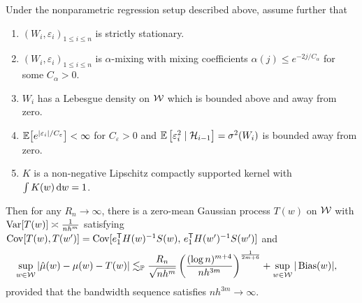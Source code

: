 \begin{proposition}%
  \label{pro:local_poly}

  Under the nonparametric regression setup described above,
  assume further that
  \begin{enumerate}[label=(\roman*)]

    \item
      $(W_i, \varepsilon_i)_{1 \leq i \leq n}$
      is strictly stationary.

    \item
      $(W_i, \varepsilon_i)_{1 \leq i \leq n}$
      is $\alpha$-mixing with mixing coefficients
      $\alpha(j) \leq e^{-2 j / C_\alpha}$
      for some $C_\alpha > 0$.

    \item
      $W_i$ has a Lebesgue density on $\mathcal{W}$
      which is bounded above and away from zero.

    \item
      $\mathbb{E}\big[e^{|\varepsilon_i|/C_\varepsilon}\big] < \infty$
      for $C_\varepsilon > 0$ and
      $\mathbb{E}\left[\varepsilon^2_i \mid \mathcal{H}_{i-1}\right]=\sigma^2(W_i)$
      is bounded away from zero.

    \item
      $K$ is a non-negative Lipschitz
      compactly supported kernel with
      $\int K(w) \,\mathrm{d}w = 1$.

  \end{enumerate}
  Then for any $R_n \to \infty$,
  there is a zero-mean Gaussian process
  $T(w)$ on $\mathcal{W}$
  with $\operatorname{Var}[T(w)] \asymp\frac{1}{n h^m}$
  satisfying
  $\operatorname{Cov}[T(w), T(w')]
  = \operatorname{Cov}[e_1^{\mathsf{T}} H(w)^{-1} S(w),\, e_1^{\mathsf{T}} H(w')^{-1} S(w')]$
  and
  \begin{align*}
    \sup_{w \in \mathcal{W}}
    \left|\hat \mu(w) - \mu(w) - T(w) \right|
    &\lesssim_{\mathbb{P}}
    \frac{R_n}{\sqrt{n h^m}}
    \left(
      \frac{(\log n)^{m+4}}{n h^{3m}}
    \right)^{\frac{1}{2m+6}}
    + \sup_{w \in \mathcal{W}} |\operatorname{Bias}(w)|,
  \end{align*}
  provided that the bandwidth sequence satisfies
  $n h^{3m} \to \infty$.
\end{proposition}

